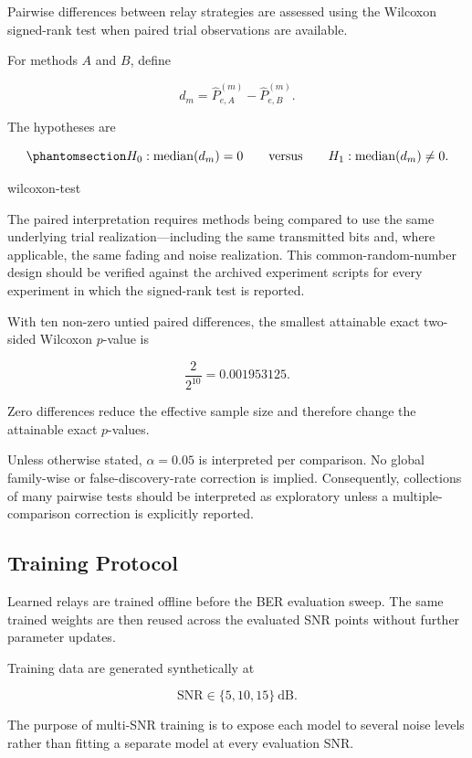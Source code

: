 Pairwise differences between relay strategies are assessed using the
Wilcoxon signed-rank test when paired trial observations are available.

For methods $A$ and $B$, define

\[
d_m
=
\hat P_{e,A}^{(m)}
-
\hat P_{e,B}^{(m)}.
\]

The hypotheses are

\begin{equation}\protect\phantomsection\label{eq:wilcoxon-test}
H_0:
\operatorname{median}(d_m)=0
\qquad
\text{versus}
\qquad
H_1:
\operatorname{median}(d_m)\neq0.
\end{equation}
{\protect\numberline{\theequation}\quad wilcoxon-test}

The paired interpretation requires methods being compared to use the
same underlying trial realization---including the same transmitted
bits and, where applicable, the same fading and noise realization.
This common-random-number design should be verified against the
archived experiment scripts for every experiment in which the
signed-rank test is reported.

With ten non-zero untied paired differences, the smallest attainable
exact two-sided Wilcoxon $p$-value is

\[
\frac{2}{2^{10}}
=
0.001953125.
\]

Zero differences reduce the effective sample size and therefore change
the attainable exact $p$-values.

Unless otherwise stated, $\alpha=0.05$ is interpreted per comparison.
No global family-wise or false-discovery-rate correction is implied.
Consequently, collections of many pairwise tests should be interpreted
as exploratory unless a multiple-comparison correction is explicitly
reported.


\subsection{Training Protocol}\label{sec:training-protocol}

Learned relays are trained offline before the BER evaluation sweep.
The same trained weights are then reused across the evaluated SNR
points without further parameter updates.

Training data are generated synthetically at

\[
\mathrm{SNR}
\in
\{5,10,15\}\ \mathrm{dB}.
\]

The purpose of multi-SNR training is to expose each model to several
noise levels rather than fitting a separate model at every evaluation
SNR.

